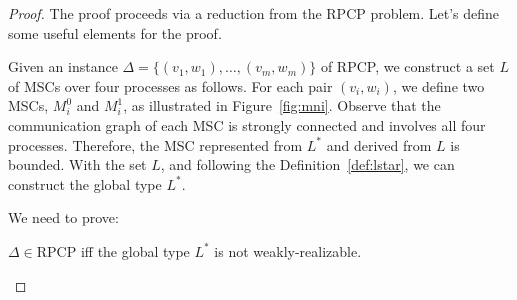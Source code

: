 \begin{proof}
	The proof proceeds via a reduction from the RPCP problem. Let's define some useful
	elements for the proof.

	Given an instance $\Delta = \{(v_1, w_1), \ldots, (v_m, w_m)\}$ of RPCP, we
	construct a set $L$ of MSCs over four processes as follows. For each pair
	$(v_i, w_i)$, we define two MSCs, $M^0_i$ and $M^1_i$, as illustrated in
	Figure~\ref{fig:mni}.
	Observe that the communication graph of each MSC is strongly connected and
	involves all four processes. Therefore, the MSC represented from
	$L^*$ and derived from $L$ is bounded.
	With the set $L$, and following the Definition~\ref{def:lstar},
	we can construct the global type $L^*$.

	We need to prove:
	\begin{center}
		$\Delta \in \text{RPCP}$ iff the global type $L^*$ is not weakly-realizable.
	\end{center}


\end{proof}
